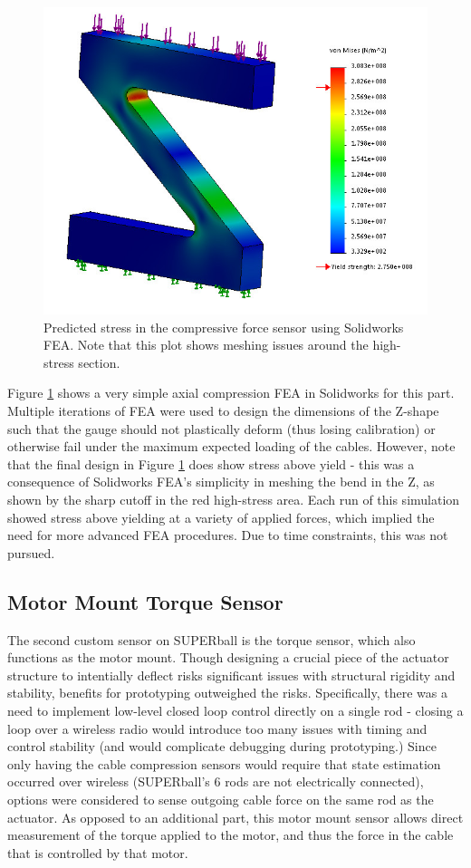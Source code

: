 \documentclass[12pt]{report}
\begin{document}
\begin{figure}[thpb]
      \centering
      \includegraphics[width=.5\columnwidth]{img/Symmetric_Z_FEA.jpg}
      \caption{Predicted stress in the compressive force sensor using Solidworks FEA. Note that this plot shows meshing issues around the high-stress section.}
      \label{fig:compressive_strain_gauge_fea}
      \vspace{-0.2cm}
\end{figure}

Figure \ref{fig:compressive_strain_gauge_fea} shows a very simple axial compression FEA in Solidworks for this part.
Multiple iterations of FEA were used to design the dimensions of the Z-shape such that the gauge should not plastically deform (thus losing calibration) or otherwise fail under the maximum expected loading of the cables.
However, note that the final design in Figure \ref{fig:compressive_strain_gauge_fea} does show stress above yield - this was a consequence of Solidworks FEA's simplicity in meshing the bend in the Z, as shown by the sharp cutoff in the red high-stress area.
Each run of this simulation showed stress above yielding at a variety of applied forces, which implied the need for more advanced FEA procedures.
Due to time constraints, this was not pursued.

\subsection{Motor Mount Torque Sensor}

The second custom sensor on SUPERball is the torque sensor, which also functions as the motor mount.
Though designing a crucial piece of the actuator structure to intentially deflect risks significant issues with structural rigidity and stability, benefits for prototyping outweighed the risks.
Specifically, there was a need to implement low-level closed loop control directly on a single rod - closing a loop over a wireless radio would introduce too many issues with timing and control stability (and would complicate debugging during prototyping.)
Since only having the cable compression sensors would require that state estimation occurred over wireless (SUPERball's 6 rods are not electrically connected), options were considered to sense outgoing cable force on the same rod as the actuator.
As opposed to an additional part, this motor mount sensor allows direct measurement of the torque applied to the motor, and thus the force in the cable that is controlled by that motor.
\end{document}
